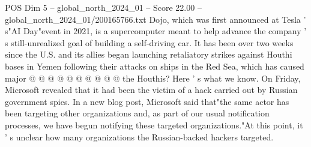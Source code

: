 \begin{textsample}{POS Dim 5 – global\_north\_2024\_01 – Score 22.00 – global\_north\_2024\_01/200165766.txt}
Dojo, which was first announced at Tesla ' s"AI Day"event in 2021, is a supercomputer meant to help advance the company ' s still-unrealized goal of building a self-driving car.
It has been over two weeks since the U.S. and its allies began launching retaliatory strikes against Houthi bases in Yemen following their attacks on ships in the Red Sea, which has caused major @ @ @ @ @ @ @ @ @ @ the Houthis?
Here ' s what we know.
On Friday, Microsoft revealed that it had been the victim of a hack carried out by Russian government spies.
In a new blog post, Microsoft said that"the same actor has been targeting other organizations and, as part of our usual notification processes, we have begun notifying these targeted organizations."At this point, it ' s unclear how many organizations the Russian-backed hackers targeted.

\end{textsample}
